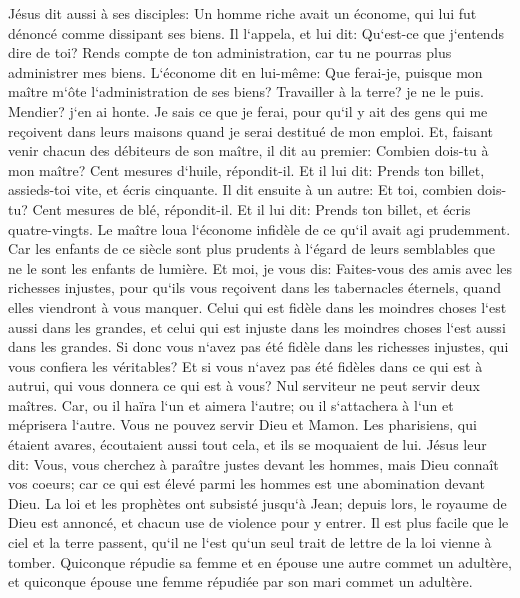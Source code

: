 \verse Jésus dit aussi à ses disciples: Un homme riche avait un économe, qui lui fut dénoncé comme dissipant ses biens. 
\verse Il l`appela, et lui dit: Qu`est-ce que j`entends dire de toi? Rends compte de ton administration, car tu ne pourras plus administrer mes biens. 
\verse L`économe dit en lui-même: Que ferai-je, puisque mon maître m`ôte l`administration de ses biens? Travailler à la terre? je ne le puis. Mendier? j`en ai honte. 
\verse Je sais ce que je ferai, pour qu`il y ait des gens qui me reçoivent dans leurs maisons quand je serai destitué de mon emploi. 
\verse Et, faisant venir chacun des débiteurs de son maître, il dit au premier: Combien dois-tu à mon maître? 
\verse Cent mesures d`huile, répondit-il. Et il lui dit: Prends ton billet, assieds-toi vite, et écris cinquante. 
\verse Il dit ensuite à un autre: Et toi, combien dois-tu? Cent mesures de blé, répondit-il. Et il lui dit: Prends ton billet, et écris quatre-vingts. 
\verse Le maître loua l`économe infidèle de ce qu`il avait agi prudemment. Car les enfants de ce siècle sont plus prudents à l`égard de leurs semblables que ne le sont les enfants de lumière. 
\verse Et moi, je vous dis: Faites-vous des amis avec les richesses injustes, pour qu`ils vous reçoivent dans les tabernacles éternels, quand elles viendront à vous manquer. 
\verse Celui qui est fidèle dans les moindres choses l`est aussi dans les grandes, et celui qui est injuste dans les moindres choses l`est aussi dans les grandes. 
\verse Si donc vous n`avez pas été fidèle dans les richesses injustes, qui vous confiera les véritables? 
\verse Et si vous n`avez pas été fidèles dans ce qui est à autrui, qui vous donnera ce qui est à vous? 
\verse Nul serviteur ne peut servir deux maîtres. Car, ou il haïra l`un et aimera l`autre; ou il s`attachera à l`un et méprisera l`autre. Vous ne pouvez servir Dieu et Mamon. 
\verse Les pharisiens, qui étaient avares, écoutaient aussi tout cela, et ils se moquaient de lui. 
\verse Jésus leur dit: Vous, vous cherchez à paraître justes devant les hommes, mais Dieu connaît vos coeurs; car ce qui est élevé parmi les hommes est une abomination devant Dieu. 
\verse La loi et les prophètes ont subsisté jusqu`à Jean; depuis lors, le royaume de Dieu est annoncé, et chacun use de violence pour y entrer. 
\verse Il est plus facile que le ciel et la terre passent, qu`il ne l`est qu`un seul trait de lettre de la loi vienne à tomber. 
\verse Quiconque répudie sa femme et en épouse une autre commet un adultère, et quiconque épouse une femme répudiée par son mari commet un adultère. 
